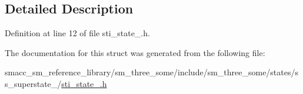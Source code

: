 \subsection{Detailed Description}


Definition at line 12 of file sti\+\_\+state\+\_.\+h.



The documentation for this struct was generated from the following file\+:\begin{DoxyCompactItemize}
\item 
smacc\+\_\+sm\+\_\+reference\+\_\+library/sm\+\_\+three\+\_\+some/include/sm\+\_\+three\+\_\+some/states/ss\+\_\+superstate\+\_/\hyperlink{sti__state__3_8h}{sti\+\_\+state\+\_.\+h}\end{DoxyCompactItemize}
